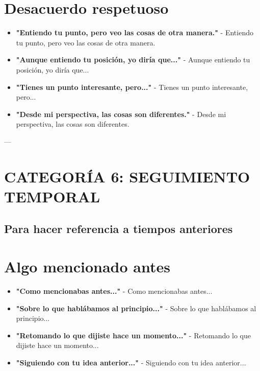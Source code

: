 \documentclass[a4paper,11pt]{article}
\begin{document}
\vspace{0.2cm}

\section{Desacuerdo respetuoso}

\begin{itemize}

  \item \textbf{"Entiendo tu punto, pero veo las cosas de otra manera."} - Entiendo tu punto, pero veo las cosas de otra manera.

  \item \textbf{"Aunque entiendo tu posición, yo diría que..."} - Aunque entiendo tu posición, yo diría que...

  \item \textbf{"Tienes un punto interesante, pero..."} - Tienes un punto interesante, pero...

  \item \textbf{"Desde mi perspectiva, las cosas son diferentes."} - Desde mi perspectiva, las cosas son diferentes.

\end{itemize}

\vspace{0.2cm}

---

\vspace{0.2cm}

\section{CATEGORÍA 6: SEGUIMIENTO TEMPORAL}

\vspace{0.2cm}

\subsection{Para hacer referencia a tiempos anteriores}

\vspace{0.2cm}

\section{Algo mencionado antes}

\begin{itemize}

  \item \textbf{"Como mencionabas antes..."} - Como mencionabas antes...

  \item \textbf{"Sobre lo que hablábamos al principio..."} - Sobre lo que hablábamos al principio...

  \item \textbf{"Retomando lo que dijiste hace un momento..."} - Retomando lo que dijiste hace un momento...

  \item \textbf{"Siguiendo con tu idea anterior..."} - Siguiendo con tu idea anterior...

\end{itemize}
\end{document}
